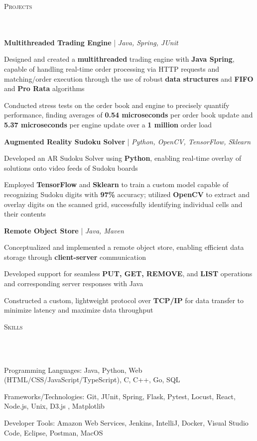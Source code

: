 \documentclass[letterpaper,10pt]{article}
\newcommand{\header}[1]{{
\hspace*{0pt}\vspace*{6pt} \textsc{#1}} \vspace*{-6pt} 
\lineunder
}
\newcommand{\lineunder}{
\vspace*{-8pt} \\ \hspace*{-3pt} 
\hrulefill \\
}
\newcommand{\project}[3]{{
\vspace*{2pt}%
\textbf{#1} #2 \hfill #3\vspace*{2pt}}
}
\renewcommand{\labelitemii}{
$\vcenter{\hbox{\tiny$\bullet$}}$\hspace*{-3pt}
}
\newenvironment{bullet-list-major}{
\begin{list}{\labelitemii}{\setlength\leftmargin{9pt} 
\topsep 0pt \itemsep -2pt}}{\vspace*{4pt}\end{list}
}
\newenvironment{bullet-list-minor}{
\begin{list}{\labelitemii}{\setlength\leftmargin{15pt} 
\topsep 0pt \itemsep -2pt}}{\vspace*{4pt}\end{list}
}
\begin{document}
\vspace*{4pt}%
\header{Projects}
    \project{Multithreaded Trading Engine}{| \textit{Java, Spring, JUnit}}{}
    \begin{bullet-list-minor}
    \item Designed and created a \textbf{multithreaded} trading engine with \textbf{Java Spring}, capable of handling real-time order processing via HTTP requests and matching/order execution through the use of robust \textbf{data structures} and \textbf{FIFO} and \textbf{Pro Rata} algorithms 
    \item Conducted stress tests on the order book and engine to precisely quantify performance, finding averages of \textbf{0.54 microseconds} per order book update and \textbf{5.37 microseconds} per engine update over a \textbf{1 million} order load
    \end{bullet-list-minor}
    \project{Augmented Reality Sudoku Solver}{| \textit{Python, OpenCV, TensorFlow, Sklearn}}{}
    \begin{bullet-list-minor}
    \item Developed an AR Sudoku Solver using \textbf{Python}, enabling real-time overlay of solutions onto video feeds of Sudoku boards
    \item Employed \textbf{TensorFlow} and \textbf{Sklearn} to train a custom model capable of recognizing Sudoku digits with \textbf{97\%} accuracy; utilized \textbf{OpenCV} to extract and overlay digits on the scanned grid, successfully identifying individual cells and their contents
    \end{bullet-list-minor}
    \project{Remote Object Store}{| \textit{Java, Maven}}{}
    \begin{bullet-list-minor}
        \item Conceptualized and implemented a remote object store, enabling efficient data storage through \textbf{client-server} communication
        \item Developed support for seamless \textbf{PUT, GET, REMOVE}, and \textbf{LIST} operations and corresponding server responses with Java
        \item Constructed a custom, lightweight protocol over \textbf{TCP/IP} for data transfer to minimize latency and maximize data throughput
    \end{bullet-list-minor}
    
\vspace*{4pt}%
\header{Skills}
    \begin{bullet-list-major}
    \item Programming Languages: Java, Python, Web (HTML/CSS/JavaScript/TypeScript), C, C++, Go, SQL
    \item Frameworks/Technologies: Git, JUnit, Spring, Flask, Pytest, Locust, React, Node.js, Unix, D3.js , Matplotlib
    \item Developer Tools: Amazon Web Services, Jenkins, IntelliJ, Docker, Visual Studio Code, Eclipse, Postman, MacOS
    \end{bullet-list-major}
\end{document}
